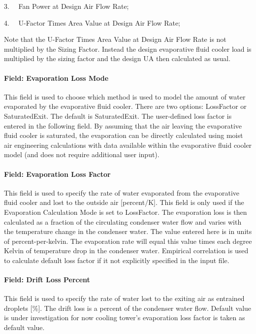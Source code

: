 3.~~ Fan Power at Design Air Flow Rate;

4.~~ U-Factor Times Area Value at Design Air Flow Rate;

Note that the U-Factor Times Area Value at Design Air Flow Rate is not multiplied by the Sizing Factor. Instead the design evaporative fluid cooler load is multiplied by the sizing factor and the design UA then calculated as usual.

\paragraph{Field: Evaporation Loss Mode}\label{field-evaporation-loss-mode-4}

This field is used to choose which method is used to model the amount of water evaporated by the evaporative fluid cooler. There are two options: LossFactor or SaturatedExit. The default is SaturatedExit. The user-defined loss factor is entered in the following field. By assuming that the air leaving the evaporative fluid cooler is saturated, the evaporation can be directly calculated using moist air engineering calculations with data available within the evaporative fluid cooler model (and does not require additional user input).

\paragraph{Field: Evaporation Loss Factor}\label{field-evaporation-loss-factor-4}

This field is used to specify the rate of water evaporated from the evaporative fluid cooler and lost to the outside air {[}percent/K{]}. This field is only used if the Evaporation Calculation Mode is set to LossFactor. The evaporation loss is then calculated as a fraction of the circulating condenser water flow and varies with the temperature change in the condenser water. The value entered here is in units of percent-per-kelvin. The evaporation rate will equal this value times each degree Kelvin of temperature drop in the condenser water. Empirical correlation is used to calculate default loss factor if it not explicitly specified in the input file.

\paragraph{Field: Drift Loss Percent}\label{field-drift-loss-percent-4}

This field is used to specify the rate of water lost to the exiting air as entrained droplets {[}\%{]}. The drift loss is a percent of the condenser water flow. Default value is under investigation for now cooling tower's evaporation loss factor is taken as default value.

